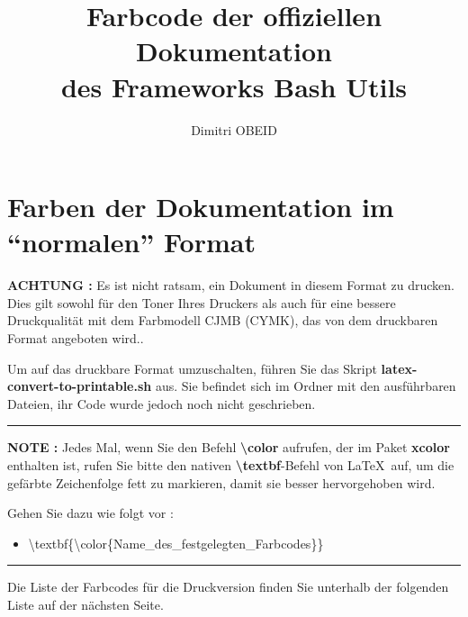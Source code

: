 \documentclass[a4paper,10pt]{article}
\title{\color{red}Farbcode \color{orange}der \color{yellow}offiziellen \color{green}Dokumentation \\\color{blue}des \color{violet}Frameworks \color{red}Bash \color{orange}Utils}\color{text}
\author{Dimitri OBEID}
\begin{document}
    \maketitle
    \newpage

    \color{sec1}
    \section{Farben der Dokumentation im ``normalen'' Format}\color{text}

    \begin{justify}
        \textbf{\color{case}ACHTUNG :} Es ist nicht ratsam, ein Dokument in diesem Format zu drucken. Dies gilt sowohl für den Toner Ihres Druckers als auch für eine bessere Druckqualität mit dem Farbmodell CJMB (CYMK), das von dem druckbaren Format angeboten wird..

        Um auf das druckbare Format umzuschalten, führen Sie das Skript \textbf{\color{cmds}latex-convert-to-printable.sh} aus. Sie befindet sich im Ordner mit den ausführbaren Dateien, ihr Code wurde jedoch noch nicht geschrieben.
    \end{justify}

    \color{text}\par\noindent\rule{\textwidth}{0.4pt}\color{text}

    \begin{justify}
        \textbf{NOTE :} Jedes Mal, wenn Sie den Befehl \textbf{\textbackslash{color}} aufrufen, der im Paket \textbf{xcolor} enthalten ist, rufen Sie bitte den nativen \textbf{\textbackslash{textbf}}-Befehl von \LaTeX \ auf, um die gefärbte Zeichenfolge fett zu markieren, damit sie besser hervorgehoben wird.
    \end{justify}

    \begin{justify}
        Gehen Sie dazu wie folgt vor :

        \begin{itemize}
              \item \textbackslash{textbf\{\textbackslash{color\{Name\_des\_festgelegten\_Farbcodes}\}}\}
          \end{itemize}
    \end{justify}

    \color{text}\par\noindent\rule{\textwidth}{0.4pt}\color{text}

    \begin{justify}
        Die Liste der Farbcodes für die Druckversion finden Sie unterhalb der folgenden Liste auf der nächsten Seite.
    \end{justify}
\end{document}
